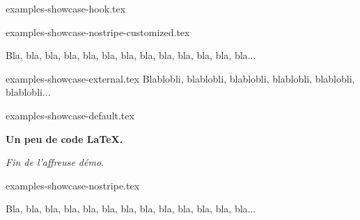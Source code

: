 \begin{filecontents*}[overwrite]{examples-showcase-hook.tex}
\begin{tdocshowcase}
\end{tdocshowcase}
\end{filecontents*}


\begin{filecontents*}[overwrite]{examples-showcase-nostripe-customized.tex}
\begin{tdocshowcase}[nostripe,
                     before     = Mon début,
                     after      = Ma fin à moi,
                     col-stripe = green,
                     col-text   = purple]
    Bla, bla, bla, bla, bla, bla, bla, bla, bla, bla, bla, bla, bla...
\end{tdocshowcase}
\end{filecontents*}


\begin{filecontents*}[overwrite]{examples-showcase-external.tex}
Blablobli, blablobli, blablobli, blablobli, blablobli, blablobli...
\end{filecontents*}


\begin{filecontents*}[overwrite]{examples-showcase-default.tex}
\begin{tdocshowcase}
    \bfseries Un peu de code \LaTeX.

    \bigskip

    \emph{\large Fin de l'affreuse démo.}
\end{tdocshowcase}
\end{filecontents*}


\begin{filecontents*}[overwrite]{examples-showcase-nostripe.tex}
\begin{tdocshowcase}[nostripe]
    Bla, bla, bla, bla, bla, bla, bla, bla, bla, bla, bla, bla, bla...
\end{tdocshowcase}
\end{filecontents*}



\documentclass{tutodoc}

\usepackage[T1]{fontenc}

\usepackage{enumitem}

\usepackage[french]{babel, varioref}

\usepackage{multicol}
\usepackage{tasks}

